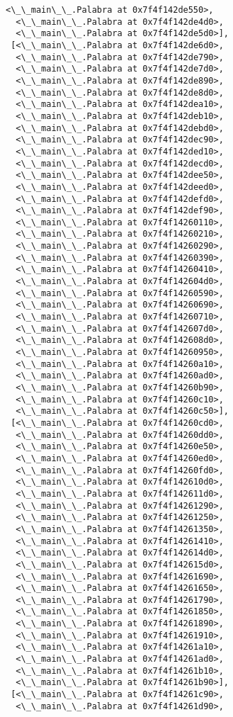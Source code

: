 \documentclass[12pt,a4paper,table]{article}
\begin{document}
\begin{tcolorbox}[breakable, size=fbox, boxrule=.5pt, pad at break*=1mm, opacityfill=0]
\begin{Verbatim}[commandchars=\\\{\}]
  <\_\_main\_\_.Palabra at 0x7f4f142de550>,
  <\_\_main\_\_.Palabra at 0x7f4f142de4d0>,
  <\_\_main\_\_.Palabra at 0x7f4f142de5d0>],
 [<\_\_main\_\_.Palabra at 0x7f4f142de6d0>,
  <\_\_main\_\_.Palabra at 0x7f4f142de790>,
  <\_\_main\_\_.Palabra at 0x7f4f142de7d0>,
  <\_\_main\_\_.Palabra at 0x7f4f142de890>,
  <\_\_main\_\_.Palabra at 0x7f4f142de8d0>,
  <\_\_main\_\_.Palabra at 0x7f4f142dea10>,
  <\_\_main\_\_.Palabra at 0x7f4f142deb10>,
  <\_\_main\_\_.Palabra at 0x7f4f142debd0>,
  <\_\_main\_\_.Palabra at 0x7f4f142dec90>,
  <\_\_main\_\_.Palabra at 0x7f4f142ded10>,
  <\_\_main\_\_.Palabra at 0x7f4f142decd0>,
  <\_\_main\_\_.Palabra at 0x7f4f142dee50>,
  <\_\_main\_\_.Palabra at 0x7f4f142deed0>,
  <\_\_main\_\_.Palabra at 0x7f4f142defd0>,
  <\_\_main\_\_.Palabra at 0x7f4f142def90>,
  <\_\_main\_\_.Palabra at 0x7f4f14260110>,
  <\_\_main\_\_.Palabra at 0x7f4f14260210>,
  <\_\_main\_\_.Palabra at 0x7f4f14260290>,
  <\_\_main\_\_.Palabra at 0x7f4f14260390>,
  <\_\_main\_\_.Palabra at 0x7f4f14260410>,
  <\_\_main\_\_.Palabra at 0x7f4f142604d0>,
  <\_\_main\_\_.Palabra at 0x7f4f14260590>,
  <\_\_main\_\_.Palabra at 0x7f4f14260690>,
  <\_\_main\_\_.Palabra at 0x7f4f14260710>,
  <\_\_main\_\_.Palabra at 0x7f4f142607d0>,
  <\_\_main\_\_.Palabra at 0x7f4f142608d0>,
  <\_\_main\_\_.Palabra at 0x7f4f14260950>,
  <\_\_main\_\_.Palabra at 0x7f4f14260a10>,
  <\_\_main\_\_.Palabra at 0x7f4f14260ad0>,
  <\_\_main\_\_.Palabra at 0x7f4f14260b90>,
  <\_\_main\_\_.Palabra at 0x7f4f14260c10>,
  <\_\_main\_\_.Palabra at 0x7f4f14260c50>],
 [<\_\_main\_\_.Palabra at 0x7f4f14260cd0>,
  <\_\_main\_\_.Palabra at 0x7f4f14260dd0>,
  <\_\_main\_\_.Palabra at 0x7f4f14260e50>,
  <\_\_main\_\_.Palabra at 0x7f4f14260ed0>,
  <\_\_main\_\_.Palabra at 0x7f4f14260fd0>,
  <\_\_main\_\_.Palabra at 0x7f4f142610d0>,
  <\_\_main\_\_.Palabra at 0x7f4f142611d0>,
  <\_\_main\_\_.Palabra at 0x7f4f14261290>,
  <\_\_main\_\_.Palabra at 0x7f4f14261250>,
  <\_\_main\_\_.Palabra at 0x7f4f14261350>,
  <\_\_main\_\_.Palabra at 0x7f4f14261410>,
  <\_\_main\_\_.Palabra at 0x7f4f142614d0>,
  <\_\_main\_\_.Palabra at 0x7f4f142615d0>,
  <\_\_main\_\_.Palabra at 0x7f4f14261690>,
  <\_\_main\_\_.Palabra at 0x7f4f14261650>,
  <\_\_main\_\_.Palabra at 0x7f4f14261790>,
  <\_\_main\_\_.Palabra at 0x7f4f14261850>,
  <\_\_main\_\_.Palabra at 0x7f4f14261890>,
  <\_\_main\_\_.Palabra at 0x7f4f14261910>,
  <\_\_main\_\_.Palabra at 0x7f4f14261a10>,
  <\_\_main\_\_.Palabra at 0x7f4f14261ad0>,
  <\_\_main\_\_.Palabra at 0x7f4f14261b10>,
  <\_\_main\_\_.Palabra at 0x7f4f14261b90>],
 [<\_\_main\_\_.Palabra at 0x7f4f14261c90>,
  <\_\_main\_\_.Palabra at 0x7f4f14261d90>,

\end{Verbatim}
\end{tcolorbox}
\end{document}
